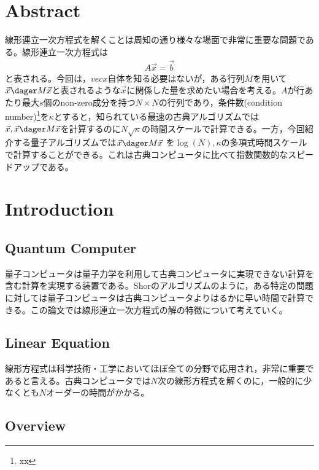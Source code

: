 \documentclass[b5paper,papersize,fleqn]{jsarticle}
\begin{document}
\title{}
\author{05-201564 Shun Yamasaki}
\date{\today}
\maketitle

\section{Abstract}
線形連立一次方程式を解くことは周知の通り様々な場面で非常に重要な問題である。線形連立一次方程式は
\begin{eqnarray}
  A\vec{x} = \vec{b}
\end{eqnarray}
と表される。今回は，$vec{x}$自体を知る必要はないが，ある行列$M$を用いて$\vec{x}\dager M \vec{x}$と表されるような$\vec{x}$に関係した量を求めたい場合を考える。$A$が行あたり最大$s$個のnon-zero成分を持つ$N\times N$の行列であり，条件数(condition number)\footnote{xx}を$\kappa $とすると，知られている最速の古典アルゴリズムでは$\vec{x},\vec{x}\dager M \vec{x}$を計算するのに$N\sqrt{\kappa }$の時間スケールで計算できる。一方，今回紹介する量子アルゴリズムでは$\vec{x}\dager M \vec{x}$
を$\log(N),\kappa $の多項式時間スケールで計算することができる。これは古典コンピュータに比べて指数関数的なスピードアップである。

\section{Introduction}
\subsection{Quantum Computer}

量子コンピュータは量子力学を利用して古典コンピュータに実現できない計算を含む計算を実現する装置である。Shorのアルゴリズムのように，ある特定の問題に対しては量子コンピュータは古典コンピュータよりはるかに早い時間で計算できる。この論文では線形連立一次方程式の解の特徴について考えていく。

\subsection{Linear Equation}

線形方程式は科学技術・工学においてほぼ全ての分野で応用され，非常に重要であると言える。古典コンピュータでは$N$次の線形方程式を解くのに，一般的に少なくとも$N$オーダーの時間がかかる。

\subsection{Overview}
\end{document}
